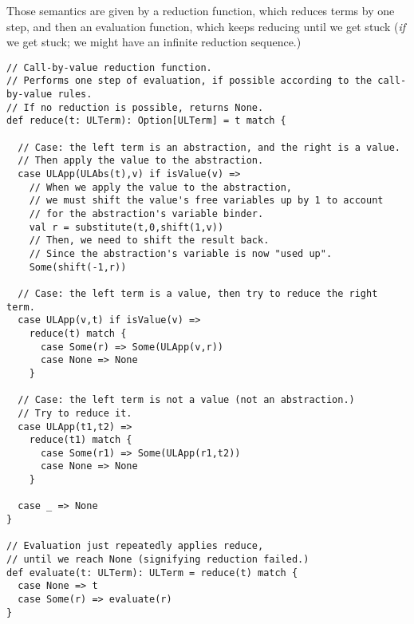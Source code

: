 \documentclass[11pt]{article}
\begin{document}
Those semantics are given by a reduction function,
which reduces terms by one step, and then an evaluation function,
which keeps reducing until we get stuck (\emph{if} we get stuck;
we might have an infinite reduction sequence.)
\begin{verbatim}
// Call-by-value reduction function.
// Performs one step of evaluation, if possible according to the call-by-value rules.
// If no reduction is possible, returns None.
def reduce(t: ULTerm): Option[ULTerm] = t match {

  // Case: the left term is an abstraction, and the right is a value.
  // Then apply the value to the abstraction.
  case ULApp(ULAbs(t),v) if isValue(v) =>
    // When we apply the value to the abstraction,
    // we must shift the value's free variables up by 1 to account
    // for the abstraction's variable binder.
    val r = substitute(t,0,shift(1,v))
    // Then, we need to shift the result back.
    // Since the abstraction's variable is now "used up".
    Some(shift(-1,r))

  // Case: the left term is a value, then try to reduce the right term.
  case ULApp(v,t) if isValue(v) =>
    reduce(t) match {
      case Some(r) => Some(ULApp(v,r))
      case None => None
    }

  // Case: the left term is not a value (not an abstraction.)
  // Try to reduce it.
  case ULApp(t1,t2) =>
    reduce(t1) match {
      case Some(r1) => Some(ULApp(r1,t2))
      case None => None
    }
    
  case _ => None
}

// Evaluation just repeatedly applies reduce,
// until we reach None (signifying reduction failed.)
def evaluate(t: ULTerm): ULTerm = reduce(t) match {
  case None => t
  case Some(r) => evaluate(r)
}
\end{verbatim}
\end{document}
